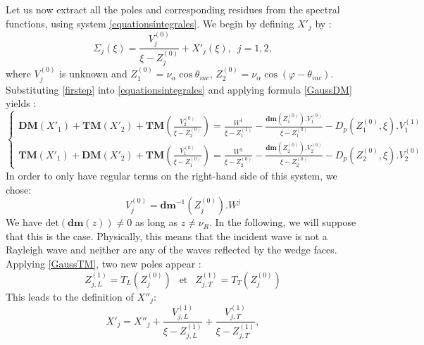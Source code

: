 Let us now extract all the poles and corresponding residues from the spectral functions, using system \eqref{equationsintegrales}. We begin by defining $X'_j$ by :
\begin{equation}
\Sigma_j(\xi)= \frac{V_j^{(0)}}{\xi-Z^{(0)}_j}+X'_j(\xi), \, \, \, j=1,2,
\label{firstep}
\end{equation}
where $V_j^{(0)}$ is unknown and $Z_1^{(0)}=\nu_{\alpha} \cos \theta_{inc}, \, Z_2^{(0)}=\nu_{\alpha} \cos(\varphi-\theta_{inc})$. Substituting \eqref{firstep} into \eqref{equationsintegrales} and applying formula \eqref{GaussDM} yields :
\begin{equation}
\left\{
\begin{matrix}
\textbf{DM}(X'_1)+\textbf{TM}(X'_2)+\textbf{TM}(\frac{V_2^{(0)}}{\xi-Z_2^{(0)}})=\frac{W^1}{\xi-Z_1^{(1)}}-\frac{\textbf{dm}(Z_1^{(0)}).V_1^{(0)}}{\xi-Z_1^{(0)}}-D_p(Z_1^{(0)},\xi).V_1^{(1)}\\
\textbf{TM}(X'_1)+\textbf{DM}(X'_2)+\textbf{TM}(\frac{V_1^{(0)}}{\xi-Z_1^{(0)}})=\frac{W^2}{\xi-Z_2^{(0)}}-\frac{\textbf{dm}(Z_2^{(0)}).V_2^{(0)}}{\xi-Z_2^{(0)}}-D_p(Z_2^{(0)},\xi).V_2^{(0)}
\end{matrix}
\right.
\end{equation}
In order to only have regular terms on the right-hand side of this system, we chose:
\begin{equation}
V_j^{(0)}=\textbf{dm}^{-1}(Z_j^{(0)}).W^j
\end{equation}
We have $\mbox{det}(\textbf{dm}(z) )\neq 0$ as long as $z\neq \nu_R$. In the following, we will suppose that this is the case. Physically, this means that the incident wave is not a Rayleigh wave and neither are any of the waves reflected by the wedge faces.
Applying \eqref{GaussTM}, two new poles appear :
\begin{equation}
Z^{(1)}_{j,L}=T_L(Z_j^{(0)}) \,\;\mbox{ et }\,\; Z^{(1)}_{j,T}=T_T(Z_j^{(0)})
\end{equation}
This leads to the definition of $X''_j$:
\begin{equation}
X'_j=X''_j+\frac{V_{j,L}^{(1)}}{\xi-Z_{j,L}^{(1)}}+\frac{V_{j,T}^{(1)}}{\xi-Z_{j,T}^{(1)}},
\end{equation}
